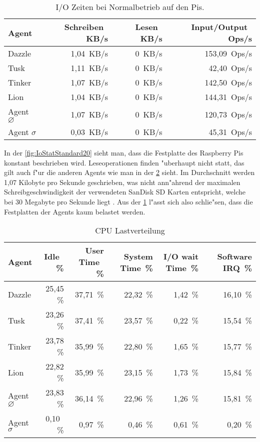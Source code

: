 \begin{table}
\centering
\begin{tabular}{l%
 r<{\,KB/s}%
 r<{\,KB/s}%
 r<{\,Ops/s}%
}
Agent	  			& Schreiben	 	& Lesen			& Input/Output 		\\	
\hline
Dazzle 				& 1,04			& 0			& 153,09	        \\
Tusk 				& 1,11			& 0			& 42,40			\\
Tinker				& 1,07 			& 0			& 142,50		 	\\
Lion				& 1,04			& 0			& 144,31	 	\\
Agent $\diameter $  		& 1,07			& 0			& 120,73		\\   
Agent $\sigma $ 		& 0,03  		& 0			& 45,31			\\
\end{tabular}
\caption{I/O Zeiten bei Normalbetrieb auf den Pis.}
\label{tab:NormalbetriebIoStat20Mb}
\end{table}


In der \cref{fig:IoStatStandard20} sieht man, dass die Festplatte des Raspberry Pis konstant beschrieben wird. %
Leseoperationen finden "uberhaupt nicht statt, das gilt auch f"ur die anderen Agents wie man in der \cref{tab:CPUlastverteilung20Mb} sieht. %
Im Durchschnitt werden 1,07 Kilobyte pro Sekunde geschrieben, %
was nicht ann"ahrend der maximalen Schreibgeschwindigkeit der verwendeten %
SanDisk SD Karten entspricht, welche bei 30 Megabyte pro Sekunde liegt \autocite{san:sd}. %
Aus der \cref{tab:NormalbetriebIoStat20Mb} l"asst sich also schlie"sen, dass die Festplatten der Agents kaum belastet werden. %

\begin{table}
\centering
\begin{tabular}{l%
 r<{\,\%}%
 r<{\,\%}%
 r<{\,\%}%
 r<{\,\%}%
 r<{\,\%}%
}
Agent  				& Idle			& User Time		& System Time		& I/O wait Time	& Software IRQ	\\
\hline
Dazzle 				& 25,45			& 37,71			& 22,32 		& 1,42		& 16,10	\\
Tusk 				& 23,26			& 37,41			& 23,57			& 0,22		& 15,54	\\
Tinker				& 23,78			& 35,99			& 22,80			& 1,65		& 15,77	\\
Lion				& 22,82			& 35,99			& 23,15			& 1,73		& 15,84	\\ 
Agent $\diameter $  		& 23,83			& 36,14			& 22,96			& 1,26	 	& 15,81	\\   
Agent $\sigma $			&  0,10			&  0,97			&  0,46			& 0,61		& 0,20  \\ %
%
\end{tabular}
\caption{CPU Lastverteilung}
\label{tab:CPUlastverteilung20Mb}
\end{table}

